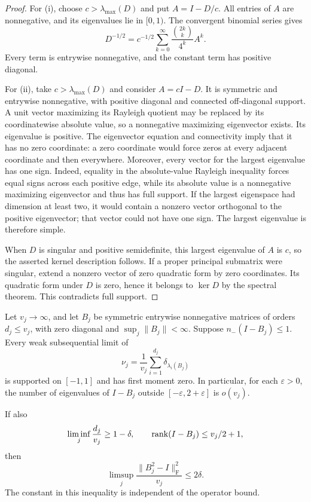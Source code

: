 \begin{proof}
For (i), choose $c>\lambda_{\max}(D)$ and put $A=I-D/c$.
All entries of $A$ are nonnegative, and its eigenvalues lie in $[0,1)$.
The convergent binomial series gives
\begin{equation}\label{mr:inverse-root}
 D^{-1/2}=c^{-1/2}\sum_{k=0}^{\infty}
       \frac{\binom{2k}{k}}{4^k}A^k.
\end{equation}
Every term is entrywise nonnegative, and the constant term has positive
diagonal.

For (ii), take $c>\lambda_{\max}(D)$ and consider $A=cI-D$.
It is symmetric and entrywise nonnegative, with positive diagonal and
connected off-diagonal support.  A unit vector maximizing its Rayleigh
quotient may be replaced by its coordinatewise absolute value, so a
nonnegative maximizing eigenvector exists.  Its eigenvalue is positive.
The eigenvector equation and connectivity imply that it has no zero
coordinate: a zero coordinate would force zeros at every adjacent
coordinate and then everywhere.  Moreover, every vector for the largest
eigenvalue has one sign.  Indeed, equality in the absolute-value
Rayleigh inequality forces equal signs across each positive edge, while
its absolute value is a nonnegative maximizing eigenvector and thus has
full support.  If the largest eigenspace had dimension at least two, it
would contain a nonzero vector orthogonal to the positive eigenvector;
that vector could not have one sign.  The largest eigenvalue is therefore
simple.

When $D$ is singular and positive semidefinite, this largest eigenvalue
of $A$ is $c$, so the asserted kernel description follows.  If a proper
principal submatrix were singular, extend a nonzero vector of zero
quadratic form by zero coordinates.  Its quadratic form under $D$ is
zero, hence it belongs to $\ker D$ by the spectral theorem.  This
contradicts full support.
\end{proof}

\begin{lemma}
\label{mr:spectral-support}
Let $v_j\to\infty$, and let $B_j$ be symmetric entrywise nonnegative
matrices of orders $d_j\le v_j$, with zero diagonal and
$\sup_j\|B_j\|<\infty$.  Suppose $n_-(I-B_j)\le1$.
Every weak subsequential limit of
\[
 \nu_j=\frac1{v_j}\sum_{i=1}^{d_j}\delta_{\lambda_i(B_j)}
\]
is supported on $[-1,1]$ and has first moment zero.  In particular, for
each $\varepsilon>0$, the number of eigenvalues of $I-B_j$ outside
$[-\varepsilon,2+\varepsilon]$ is $o(v_j)$.

If also
\[
 \liminf_j\frac{d_j}{v_j}\ge1-\delta,
 \qquad \operatorname{rank}(I-B_j)\le v_j/2+1,
\]
then
\begin{equation}\label{mr:spectral-error}
 \limsup_j\frac{\|B_j^2-I\|_{\mathrm F}^2}{v_j}\le2\delta.
\end{equation}
The constant in this inequality is independent of the operator bound.
\end{lemma}

